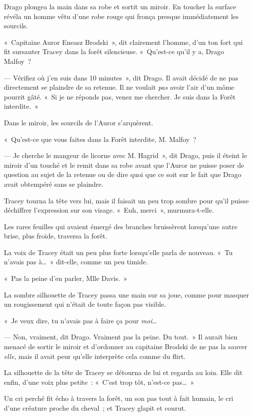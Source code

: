 Drago plongea la main dans sa robe et sortit un miroir. En toucher la surface révéla un homme vêtu d'une robe rouge qui fronça presque immédiatement les sourcils.

«~Capitaine Auror Eneasz Brodski~», dit clairement l'homme, d'un ton fort qui fit sursauter Tracey dans la forêt silencieuse. «~Qu'est-ce qu'il y a, Drago Malfoy~?

--- Vérifiez où j'en suis dans 10 minutes~», dit Drago. Il avait décidé de ne pas directement se plaindre de sa retenue. Il ne voulait \emph{pas} avoir l'air d'un môme pourrit gâté. «~Si je ne réponds pas, venez me chercher. Je suis dans la Forêt interdite.~»

Dans le miroir, les sourcils de l'Auror s'arquèrent.

«~Qu'est-ce que vous faites dans la Forêt interdite, M. Malfoy~?

--- Je cherche le mangeur de licorne avec M. Hagrid~», dit Drago, puis il éteint le miroir d'un touché et le remit dans sa robe avant que l'Auror ne puisse poser de question au sujet de la retenue ou de dire quoi que ce soit sur le fait que Drago avait obtempéré sans se plaindre.

Tracey tourna la tête vers lui, mais il faisait un peu trop sombre pour qu'il puisse déchiffrer l'expression sur son visage. «~Euh, merci~», murmura-t-elle.

Les rares feuilles qui avaient émergé des branches bruissèrent lorsqu'une autre brise, plus froide, traversa la forêt.

La voix de Tracey était un peu plus forte lorsqu'elle parla de nouveau. «~Tu n'avais pas à…~» dit-elle, comme un peu timide.

«~Pas la peine d'en parler, Mlle Davis.~»

La sombre silhouette de Tracey passa une main sur sa joue, comme pour masquer un rougissement qui n'était de toute façon pas visible.

«~Je veux dire, tu n'avais pas à faire ça pour \emph{moi}…

--- Non, vraiment, dit Drago. Vraiment pas la peine. Du tout.~» Il aurait bien menacé de sortir le miroir et d'ordonner au capitaine Brodski de ne pas la sauver \emph{elle}, mais il avait peur qu'elle interprète cela comme du flirt.

La silhouette de la tête de Tracey se détourna de lui et regarda au loin. Elle dit enfin, d'une voix plus petite~: «~C'est trop tôt, n'est-ce pas…~»

Un cri perché fit écho à travers la forêt, un son pas tout à fait humain, le cri d'une créature proche du cheval~; et Tracey glapit et courut.

